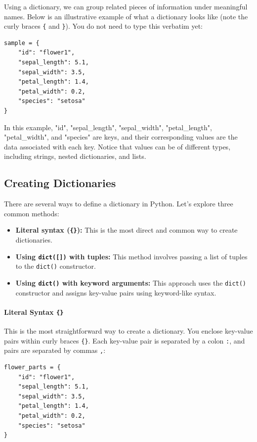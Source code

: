 Using a dictionary, we can group related pieces of information under meaningful names. Below is an illustrative example of what a dictionary looks like (note the curly braces \texttt{\{} and \texttt{\}}). You do not need to type this verbatim yet:

\begin{verbatim}
sample = {
    "id": "flower1",
    "sepal_length": 5.1,
    "sepal_width": 3.5,
    "petal_length": 1.4,
    "petal_width": 0.2,
    "species": "setosa"
}
\end{verbatim}

In this example, "id", "sepal\_length", "sepal\_width", "petal\_length", "petal\_width", and "species" are keys, and their corresponding values are the data associated with each key. Notice that values can be of different types, including strings, nested dictionaries, and lists.


\subsection{Creating Dictionaries}
\label{subsubsec:creating_dicts}
There are several ways to define a dictionary in Python. Let's explore three common methods:

\begin{itemize}
\item \textbf{Literal syntax (\texttt{\{\}}):} This is the most direct and common way to create dictionaries.
\item \textbf{Using \texttt{dict([])} with tuples:} This method involves passing a list of tuples to the \texttt{dict()} constructor.
\item \textbf{Using \texttt{dict()} with keyword arguments:} This approach uses the \texttt{dict()} constructor and assigns key-value pairs using keyword-like syntax.
\end{itemize}

\paragraph{Literal Syntax \texttt{\{\}}}
This is the most straightforward way to create a dictionary. You enclose key-value pairs within curly braces \texttt{\{\}}. Each key-value pair is separated by a colon \texttt{:}, and pairs are separated by commas \texttt{,}:

\begin{verbatim}
flower_parts = {
    "id": "flower1",
    "sepal_length": 5.1,
    "sepal_width": 3.5,
    "petal_length": 1.4,
    "petal_width": 0.2,
    "species": "setosa"
}
\end{verbatim}


